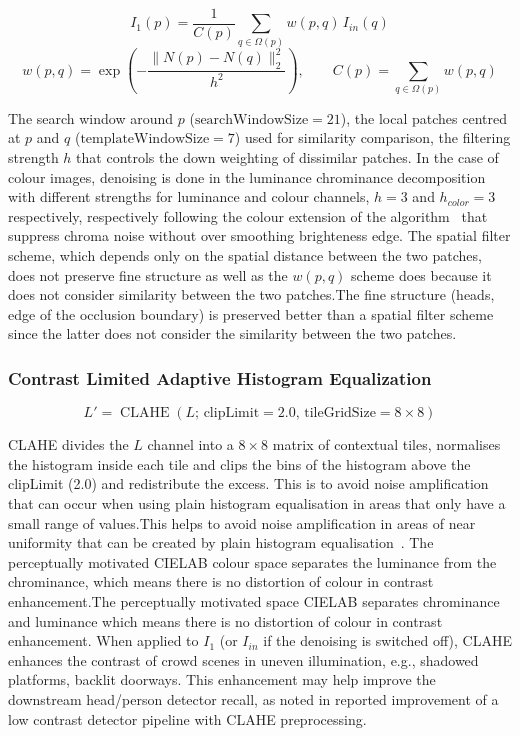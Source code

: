 \begin{equation}
	I_{1}(p) = \frac{1}{C(p)} \sum_{q \in \Omega(p)} w(p,q)\, I_{in}(q)
	\label{eq:nlm-estimate}
\end{equation}
\begin{equation}
	w(p,q) = \exp\left(-\frac{\lVert N(p) - N(q) \rVert_2^2}{h^2}\right), \qquad C(p) = \sum_{q \in \Omega(p)} w(p,q)
	\label{eq:nlm-weight}
\end{equation}
\hfill

The search window around $p$ ($\text{searchWindowSize}=21$), the local patches centred at $p$ and $q$ ($\text{templateWindowSize}=7$) used for similarity comparison, the filtering strength $h$ that controls the down weighting of dissimilar patches. In the case of colour images, denoising is done in the luminance chrominance decomposition with different strengths for luminance and colour channels, $h=3$ and $h_{color}=3$ respectively, respectively following the colour extension of the algorithm~\cite{buades2005nonlocal_colour} that suppress chroma noise without over smoothing brighteness edge. The spatial filter scheme, which depends only on the spatial distance between the two patches, does not preserve fine structure as well as the $w(p,q)$ scheme does because it does not consider similarity between the two patches.The fine structure (heads, edge of the occlusion boundary) is preserved better than a spatial filter scheme since the latter does not consider the similarity between the two patches. 

\subsubsection{Contrast Limited Adaptive Histogram Equalization}

\begin{equation}
	L' =
	\operatorname{CLAHE}\left(
	L;\,\text{clipLimit}=2.0,\,
	\text{tileGridSize}=8\times8
	\right)
	\label{eq:clahe}
\end{equation}


CLAHE divides the $L$ channel into a $8 \times 8$ matrix of contextual tiles, normalises the histogram inside each tile and clips the bins of the histogram above the clipLimit (2.0) and redistribute the excess. This is to avoid noise amplification that can occur when using plain histogram equalisation in areas that only have a small range of values.This helps to avoid noise amplification in areas of near uniformity that can be created by plain histogram equalisation~\cite{zuiderveld1994clahe}. The perceptually motivated CIELAB colour space separates the luminance from the chrominance, which means there is no distortion of colour in contrast enhancement.The perceptually motivated space CIELAB separates chrominance and luminance which means there is no distortion of colour in contrast enhancement. When applied to $I_1$ (or $I_{in}$ if the denoising is switched off), CLAHE enhances the contrast of crowd scenes in uneven illumination, e.g., shadowed platforms, backlit doorways. This enhancement may help improve the downstream head/person detector recall, as noted in reported improvement of a low contrast detector pipeline with CLAHE preprocessing.

